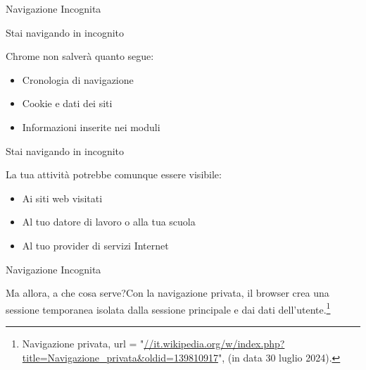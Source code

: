 \begin{frame}{Navigazione Incognita}
	\begin{alertblock}{Stai navigando in incognito}{
			Chrome non salverà quanto segue:
			\begin{itemize}
				\item Cronologia di navigazione
				\item Cookie e dati dei siti
				\item Informazioni inserite nei moduli
			\end{itemize}}
	\end{alertblock}
		\begin{alertblock}{Stai navigando in incognito}{
			La tua attività potrebbe comunque essere visibile:
			\begin{itemize}
				\item Ai siti web visitati
				\item Al tuo datore di lavoro o alla tua scuola
				\item Al tuo provider di servizi Internet
			\end{itemize}}
	\end{alertblock}
\end{frame}
\begin{frame}{Navigazione Incognita}
	\begin{alertblock}{Ma allora, a che cosa serve?}{Con la navigazione privata, il browser crea una sessione temporanea isolata dalla sessione principale e dai dati dell'utente.\footnote{Navigazione privata, url = "\url{//it.wikipedia.org/w/index.php?title=Navigazione_privata&oldid=139810917}", (in data 30 luglio 2024).}}
	\end{alertblock}
\end{frame}